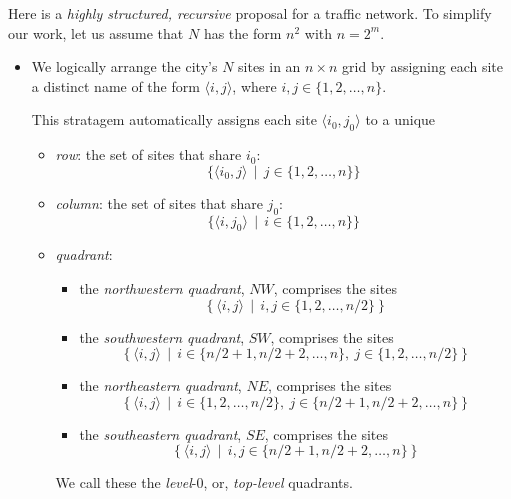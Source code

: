\begin{enumerate}

\medskip

Here is a {\em highly structured, recursive} proposal for a traffic network.  To simplify our work, let us assume that $N$ has the form $n^2$ with $n = 2^{m}$. 
  \begin{itemize}
  \item
We logically arrange the city's $N$ sites in an $n \times n$ grid by assigning each site a distinct name of the form $\langle i,j \rangle$, where $i, j \in \{1, 2, \ldots, n\}$.

\smallskip

This stratagem automatically assigns each site $\langle i_0, j_0 \rangle$ to a unique
    \begin{itemize}
    \item
{\em row}: the set of sites that share $i_0$:
\[ \{ \langle i_0, j \rangle \ \ | \ \ j \in \{1, 2, \ldots, n\} \} \]
    \medskip\item
{\em column}: the set of sites that share $j_0$:
\[ \{ \langle i, j_0 \rangle \ \ | \ \ i \in \{1, 2, \ldots, n\} \} \]
    \medskip\item    
{\em quadrant}:
            \begin{itemize}
            \item
the {\em northwestern quadrant}, $NW$, comprises the sites
\[ \left\{ \langle i,j \rangle \ \ | \ \ i, j \in \{1, 2, \ldots, n/2 \} \right\} \]

            \medskip\item
the {\em southwestern quadrant}, $SW$, comprises the sites
\[ \left\{ \langle i,j \rangle \ \ | \ \ i \in \{ n/2 +1, n/2+2, \ldots, n \}, \ j \in \{1, 2, \ldots, n/2 \} \right\} \]

            \medskip\item
the {\em northeastern quadrant}, $NE$, comprises the sites
\[ \left\{ \langle i,j \rangle \ \ | \ \ i \in \{1, 2, \ldots, n/2 \}, \ j \in \{ n/2 +1, n/2+2, \ldots, n \}  \right\} \]

            \medskip\item
the {\em southeastern quadrant}, $SE$, comprises the sites
\[ \left\{ \langle i,j \rangle \ \ | \ \ i, j \in \{ n/2 +1, n/2+2, \ldots, n \} \right\} \]
          \end{itemize}

We call these the {\em level}-$0$, or, {\em top-level} quadrants.


\end{itemize}
\end{itemize}
\end{enumerate}
